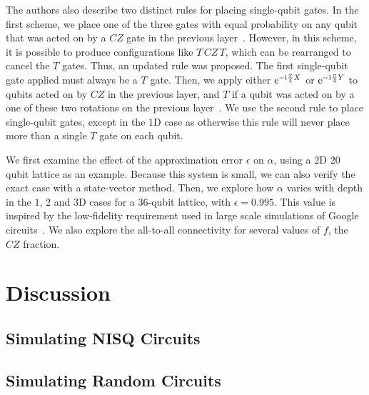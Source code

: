 The authors also describe two distinct rules for placing single-qubit gates. In the first scheme, we place one of the three gates with equal probability on any qubit that was acted on by a $CZ$ gate in the previous layer~\cite{Boixo2016}. However, in this scheme, it is possible to produce configurations like $T\,CZ\,T$, which can be rearranged to cancel the $T$ gates. Thus, an updated rule was proposed. The first single-qubit gate applied must always be a $T$ gate. Then, we apply either $\mathrm{e}^{-\mathrm{i}\frac{\pi}{4}X}$ or $\mathrm{e}^{-\mathrm{i}\frac{\pi}{4}Y}$ to qubits acted on by $CZ$ in the previous layer, and $T$ if a qubit was acted on by a one of these two rotations on the previous layer~\cite{Villalonga2018}. We use the second rule to place single-qubit gates, except in the $1$D case as otherwise this rule will never place more than a single $T$ gate on each qubit.\par
We first examine the effect of the approximation error $\epsilon$ on $\alpha$, using a $2$D $20$ qubit lattice as an example. Because this system is small, we can also verify the exact case with a state-vector method. Then, we explore how $\alpha$ varies with depth in the $1$, $2$ and $3$D cases for a $36$-qubit lattice, with $\epsilon=0.995$. This value is inspired by the low-fidelity requirement used in large scale simulations of Google circuits~\cite{Villalonga2018,Villalonga2019}. We also explore the all-to-all connectivity for several values of $f$, the $CZ$ fraction.\par
\section{Discussion}
\subsection{Simulating NISQ Circuits}
\subsection{Simulating Random Circuits}
